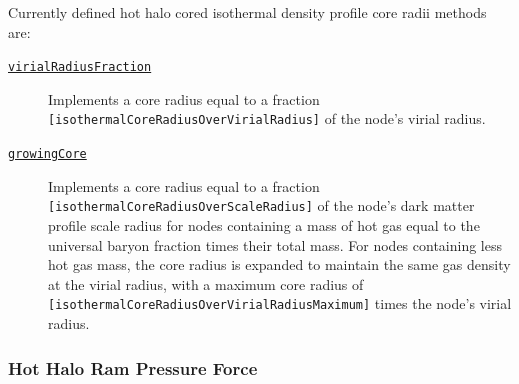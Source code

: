 Currently defined hot halo cored isothermal density profile core radii methods are:
\begin{description}
 \item [\hyperlink{hot_halo.density_profile.cored_isothermal.core_radius.virial_radius_fraction.F90:hot_halo_density_cored_isothermal_core_radii_virial_fraction:hot_halo_density_cored_isothermal_core_radius_virial_fraction}{{\tt virialRadiusFraction}}] Implements a core radius equal to a fraction {\tt [isothermalCoreRadiusOverVirialRadius]} of the node's virial radius.
 \item [\hyperlink{hot_halo.density_profile.cored_isothermal.core_radius.growing_core.F90:hot_halo_density_cored_isothermal_core_radii_growing_core:hot_halo_density_cored_isothermal_core_radius_growing_core}{{\tt growingCore}}] Implements a core radius equal to a fraction {\tt [isothermalCoreRadiusOverScaleRadius]} of the node's dark matter profile scale radius for nodes containing a mass of hot gas equal to the universal baryon fraction times their total mass. For nodes containing less hot gas mass, the core radius is expanded to maintain the same gas density at the virial radius, with a maximum core radius of {\tt [isothermalCoreRadiusOverVirialRadiusMaximum]} times the node's virial radius.
\end{description}

\subsubsection{Hot Halo Ram Pressure Force}

